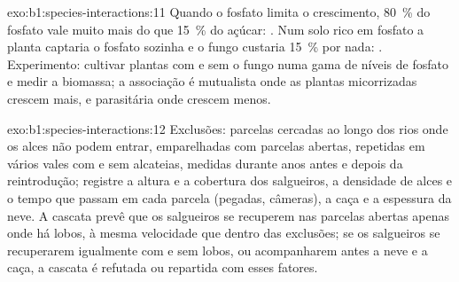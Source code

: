 \begin{solution}{exo:b1:species-interactions:11}
Quando o fosfato limita o crescimento, \qty{80}{\%} do fosfato vale
muito mais do que \qty{15}{\%} do açúcar: . Num solo rico em
fosfato a planta captaria o fosfato sozinha e o fungo custaria
\qty{15}{\%} por nada: . Experimento: cultivar plantas com
e sem o fungo numa gama de níveis de fosfato e medir a biomassa; a
associação é mutualista onde as plantas micorrizadas crescem mais, e
parasitária onde crescem menos.
\end{solution}

\begin{solution}{exo:b1:species-interactions:12}
Exclusões: parcelas cercadas ao longo dos rios onde os alces não podem
entrar, emparelhadas com parcelas abertas, repetidas em vários vales
com e sem alcateias, medidas durante anos antes e depois da
reintrodução; registre a altura e a cobertura dos salgueiros, a
densidade de alces e o tempo que passam em cada parcela (pegadas,
câmeras), a caça e a espessura da neve. A cascata prevê que os
salgueiros se recuperem nas parcelas abertas apenas onde há lobos, à
mesma velocidade que dentro das exclusões; se os salgueiros se
recuperarem igualmente com e sem lobos, ou acompanharem antes a neve e
a caça, a cascata é refutada ou repartida com esses fatores.
\end{solution}


